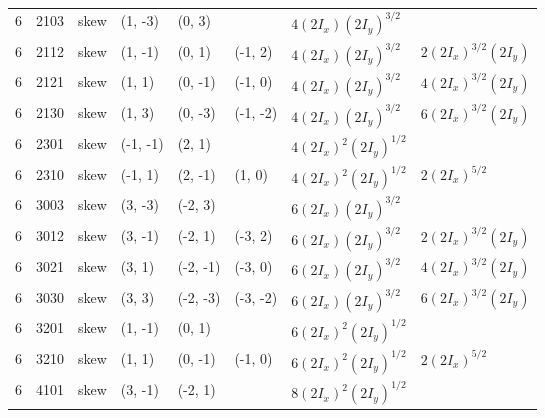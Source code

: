 {\begin{longtable}{llllllll}
6 & 2103 &   skew &   (1, -3) &   (0, 3) &          &       \colorbox{blue!10}{$4 (2I_x) (2I_y)^ {3/2}$} &                                                   \\
6 & 2112 &   skew &   (1, -1) &   (0, 1) &  (-1, 2) &       \colorbox{blue!10}{$4 (2I_x) (2I_y)^ {3/2}$} &       \colorbox{blue!10}{$2 (2I_x)^ {3/2} (2I_y)$} \\
6 & 2121 &   skew &    (1, 1) &  (0, -1) &  (-1, 0) &       \colorbox{blue!10}{$4 (2I_x) (2I_y)^ {3/2}$} &       \colorbox{blue!10}{$4 (2I_x)^ {3/2} (2I_y)$} \\
6 & 2130 &   skew &    (1, 3) &  (0, -3) & (-1, -2) &       \colorbox{blue!10}{$4 (2I_x) (2I_y)^ {3/2}$} &       \colorbox{blue!10}{$6 (2I_x)^ {3/2} (2I_y)$} \\
6 & 2301 &   skew &  (-1, -1) &   (2, 1) &          &   \colorbox{blue!10}{$4 (2I_x)^ {2} (2I_y)^ {1/2}$} &                                                   \\
6 & 2310 &   skew &   (-1, 1) &  (2, -1) &   (1, 0) &   \colorbox{blue!10}{$4 (2I_x)^ {2} (2I_y)^ {1/2}$} &           \colorbox{orange!10}{$2 (2I_x)^ {5/2} $} \\
6 & 3003 &   skew &   (3, -3) &  (-2, 3) &          &       \colorbox{blue!10}{$6 (2I_x) (2I_y)^ {3/2}$} &                                                   \\
6 & 3012 &   skew &   (3, -1) &  (-2, 1) &  (-3, 2) &       \colorbox{blue!10}{$6 (2I_x) (2I_y)^ {3/2}$} &       \colorbox{blue!10}{$2 (2I_x)^ {3/2} (2I_y)$} \\
6 & 3021 &   skew &    (3, 1) & (-2, -1) &  (-3, 0) &       \colorbox{blue!10}{$6 (2I_x) (2I_y)^ {3/2}$} &       \colorbox{blue!10}{$4 (2I_x)^ {3/2} (2I_y)$} \\
6 & 3030 &   skew &    (3, 3) & (-2, -3) & (-3, -2) &       \colorbox{blue!10}{$6 (2I_x) (2I_y)^ {3/2}$} &       \colorbox{blue!10}{$6 (2I_x)^ {3/2} (2I_y)$} \\
6 & 3201 &   skew &   (1, -1) &   (0, 1) &          &   \colorbox{blue!10}{$6 (2I_x)^ {2} (2I_y)^ {1/2}$} &                                                   \\
6 & 3210 &   skew &    (1, 1) &  (0, -1) &  (-1, 0) &   \colorbox{blue!10}{$6 (2I_x)^ {2} (2I_y)^ {1/2}$} &           \colorbox{orange!10}{$2 (2I_x)^ {5/2} $} \\
6 & 4101 &   skew &   (3, -1) &  (-2, 1) &          &   \colorbox{blue!10}{$8 (2I_x)^ {2} (2I_y)^ {1/2}$} &                                                   \\

\end{longtable}}
